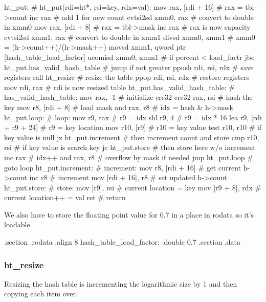 \begin{asm}
ht_put:					    # ht_put(rdi=ht*, rsi=key, rdx=val):
	mov	rax, [rdi + 16]		    #   rax = tbl->count
	inc	rax			    #   add 1 for new count
	cvtsi2sd xmm0, rax		    #   convert to double in xmm0
	mov	rax, [rdi + 8]		    #   rax = tbl->mask
	inc	rax			    #   rax is now capacity
	cvtsi2sd xmm1, rax		    #   convert to double in xmm1
	divsd   xmm0, xmm1                  #   xmm0 = (h->count++)/(h->mask++)
	movsd	xmm1, qword ptr [hash_table_load_factor]
	ucomisd xmm0, xmm1		    #   if percent < load_factr
	jbe     ht_put.has_valid_hash_table #   jump if not greater
	ppush	rdi, rsi, rdx		    #   save registers
	call	ht_resize		    #   resize the table
	ppop	rdi, rsi, rdx		    #   restore registers
	mov	rdi, rax		    #   rdi is now resized table
ht_put.has_valid_hash_table:		    # has_valid_hash_table:
	mov	rax, -1			    #   initialize crc32
	crc32	rax, rsi		    #   hash the key
	mov	r8, [rdi + 8]		    #   load mask
	and	rax, r8			    #   idx = hash & h->mask
ht_put.loop:				    # loop:
	mov	r9, rax			    #   r9 = idx
	shl	r9, 4			    #   r9 = idx * 16
	lea	r9, [rdi + r9 + 24]	    #   r9 = key location
	mov	r10, [r9]		    #   r10 = key value
	test	r10, r10		    #   if key value is null
	jz	ht_put.increment	    #   then increment count and store
	cmp	r10, rsi		    #   if key value is search key
	je	ht_put.store		    #   then store here w/o increment
	inc	rax			    #   idx++
	and	rax, r8			    #   overflow by mask if needed
	jmp	ht_put.loop		    #   goto loop
ht_put.increment:			    # increment:
	mov	r8, [rdi + 16]		    #   get current h->count
	inc	r8			    #   increment
	mov	[rdi + 16], r8		    #   set updated h->count
ht_put.store:				    # store:
	mov	[r9], rsi		    #   current location = key
	mov	[r9 + 8], rdx		    #   current location++ = val
	ret				    #   return
\end{asm}

We also have to store the floating point value for 0.7 in a place in rodata so
it's loadable.

\begin{asmdata}
.section .rodata
.align 8
hash_table_load_factor:
	.double	0.7
.section .data
\end{asmdata}

\subsubsection{ht\_resize}

Resizing the hash table is incrementing the logarithmic size by 1 and then
copying each item over.

